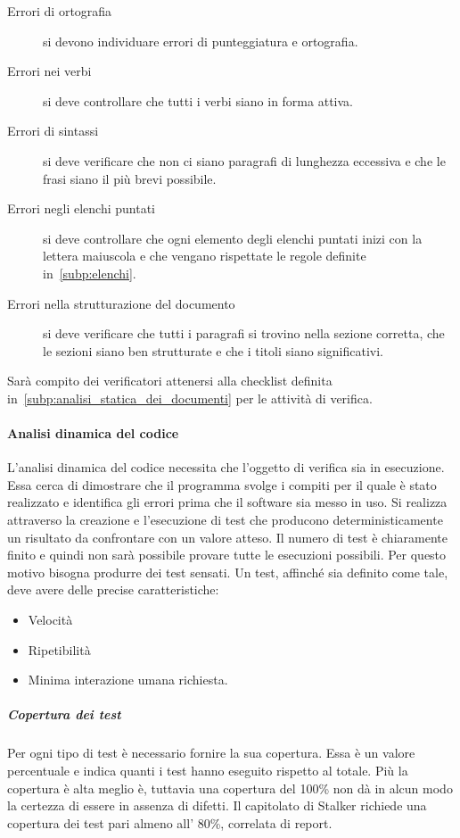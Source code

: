 \documentclass[../../norme-di-progetto.tex]{subfiles}
\begin{document}
\begin{description}
  \item [Errori di ortografia] si devono individuare errori di punteggiatura e ortografia.
  \item [Errori nei verbi] si deve controllare che tutti i verbi siano in forma attiva.
  \item [Errori di sintassi] si deve verificare che non ci siano paragrafi di lunghezza eccessiva e che le frasi siano il più brevi possibile.
  \item [Errori negli elenchi puntati] si deve controllare che ogni elemento degli elenchi puntati inizi con la lettera maiuscola e che vengano rispettate le regole definite in~\ref{subp:elenchi}.
  \item [Errori nella strutturazione del documento] si deve verificare che tutti i paragrafi si trovino nella sezione corretta, che le sezioni siano ben strutturate e che i titoli siano significativi.
\end{description}

Sarà compito dei verificatori attenersi alla checklist definita in~\ref{subp:analisi_statica_dei_documenti} per le attività di verifica.

\paragraph{Analisi dinamica del codice}%
\label{par:analisi_dinamica_del_codice}
L'analisi dinamica del codice necessita che l'oggetto di verifica sia in esecuzione.
Essa cerca di dimostrare che il programma svolge i compiti per il quale è stato realizzato e identifica gli errori prima che il software sia messo in uso.
Si realizza attraverso la creazione e l'esecuzione di test che producono deterministicamente un risultato da confrontare con un valore atteso.
Il numero di test è chiaramente finito e quindi non sarà possibile provare tutte le esecuzioni possibili.
Per questo motivo bisogna produrre dei test sensati.
Un test, affinché sia definito come tale, deve avere delle precise caratteristiche:

\begin{itemize}
  \item Velocità
  \item Ripetibilità
  \item Minima interazione umana richiesta.
\end{itemize}

\subparagraph{Copertura dei test}%
\label{subp:copertura_dei_test}
Per ogni tipo di test è necessario fornire la sua copertura.
Essa è un valore percentuale e indica quanti  i test hanno eseguito rispetto al totale.
Più la copertura è alta meglio è, tuttavia una copertura del 100\% non dà in alcun modo la certezza di essere in assenza di difetti.
Il capitolato di Stalker richiede una copertura dei test pari almeno all' 80\%, correlata di report.
\end{document}
